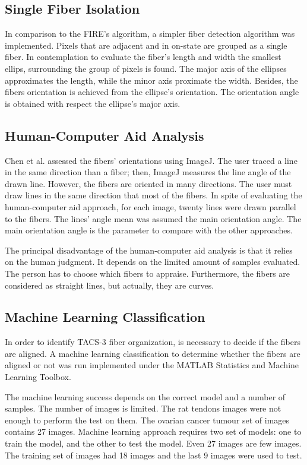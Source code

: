 \documentclass[12pt,a4paper]{article}
\begin{document}
\subsection{Single Fiber Isolation}

In comparison to the FIRE’s algorithm, a simpler fiber detection algorithm was implemented. Pixels that are adjacent and in on-state are grouped as a single fiber. In contemplation to evaluate the fiber’s length and width the smallest ellips, surrounding the group of pixels is found. The major axis of the ellipses approximates the length, while the minor axis proximate the width. Besides, the fibers orientation is achieved from the ellipse's orientation. The orientation angle is obtained with respect the ellipse’s major axis.
\subsection{Human-Computer Aid Analysis}

Chen et al. assessed the fibers' orientations using ImageJ. The user traced a line in the same direction than a fiber; then, ImageJ measures the line angle of the drawn line. However, the fibers are oriented in many directions. The user must draw lines in the same direction that most of the fibers. In spite of evaluating the human-computer aid approach, for each image, twenty lines were drawn parallel to the fibers. The lines' angle mean was assumed the main orientation angle. The main orientation angle is the parameter to compare with the other approaches.

The principal disadvantage of the human-computer aid analysis is that it relies on the human judgment. It depends on the limited amount of samples evaluated. The person has to choose which fibers to appraise. Furthermore, the fibers are considered as straight lines, but actually, they are curves.

\subsection{Machine Learning Classification}

In order to identify TACS-3 fiber organization, is necessary to decide if the fibers are aligned. A machine learning classification to determine whether the fibers are aligned or not was run implemented under the MATLAB  Statistics and Machine Learning Toolbox.

The machine learning success depends on the correct model and a number of samples. The number of images is limited. The rat tendons images were not enough to perform the test on them. The ovarian cancer tumour set of images contains 27 images. Machine learning approach requires two set of models: one to train the model, and the other to test the model. Even 27 images are few images. The training set of images had 18 images and the last 9 images were used to test.
\end{document}
